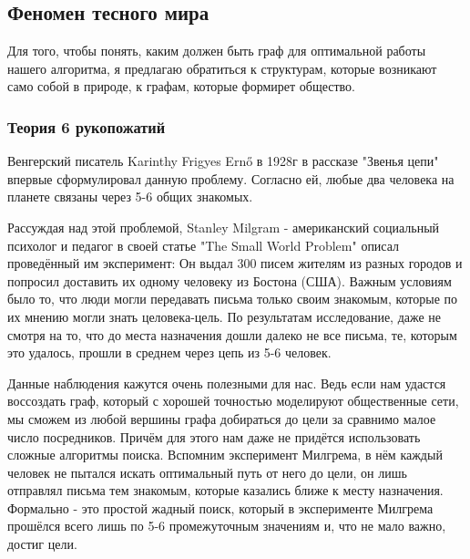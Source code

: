 \subsection{Феномен тесного мира}

Для того, чтобы понять, каким должен быть граф для 
оптимальной работы нашего алгоритма, я предлагаю обратиться
к структурам, которые возникают само собой в приро\-де, 
к графам, которые формирет общество.

\subsubsection{Теория 6 рукопожатий}

Венгерский писатель Karinthy Frigyes Ernő в 1928г в рассказе 
"Звенья цепи" впервые сформулировал данную проблему. Согласно ей, 
любые два человека на планете связаны через 5-6 общих знакомых.

Рассуждая над этой проблемой, Stanley Milgram - американский 
социальный психолог и педагог в своей статье "The Small World Problem"
описал проведённый им эксперимент: 
Он выдал 300 писем жителям из разных городов и попросил доставить 
их одному человеку из Бостона (США). Важным условиям было то, что
люди могли передавать письма только своим знакомым, которые по их
мнению могли знать целовека-цель.
По результатам исследование, даже не смотря на то, что до места назначения
дошли далеко не все письма, те, которым это удалось, прошли в среднем через цепь из
5-6 человек. 

Данные наблюдения кажутся очень полезными для нас. Ведь если нам
удастся воссоздать граф, который с хорошей точностью моделируют
общественные сети, мы сможем из любой вершины графа добираться до 
цели за сравнимо малое число посредников. Причём для этого нам даже 
не придётся использовать сложные алгоритмы поиска. Вспомним эксперимент
Милгрема, в нём каждый человек не пытался искать оптимальный путь
от него до цели, он лишь отправлял письма тем знакомым, которые казались
ближе к месту назначения. Формально - это простой жадный поиск, который
в эксперименте Милгрема прошёлся всего лишь по 5-6 промежуточным значениям
и, что не мало важно, достиг цели.


